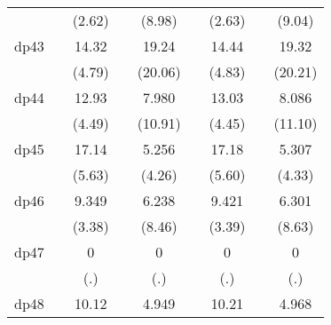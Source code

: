 {\begin{tabular}{l*{8}{c}}
            &                     &      (2.62)         &                     &      (8.98)         &                     &      (2.63)         &                     &      (9.04)         \\
[1em]
dp43        &                     &       14.32\sym{***}&                     &       19.24\sym{***}&                     &       14.44\sym{***}&                     &       19.32\sym{***}\\
            &                     &      (4.79)         &                     &     (20.06)         &                     &      (4.83)         &                     &     (20.21)         \\
[1em]
dp44        &                     &       12.93\sym{***}&                     &       7.980\sym{***}&                     &       13.03\sym{***}&                     &       8.086\sym{***}\\
            &                     &      (4.49)         &                     &     (10.91)         &                     &      (4.45)         &                     &     (11.10)         \\
[1em]
dp45        &                     &       17.14\sym{***}&                     &       5.256\sym{***}&                     &       17.18\sym{***}&                     &       5.307\sym{***}\\
            &                     &      (5.63)         &                     &      (4.26)         &                     &      (5.60)         &                     &      (4.33)         \\
[1em]
dp46        &                     &       9.349\sym{***}&                     &       6.238\sym{***}&                     &       9.421\sym{***}&                     &       6.301\sym{***}\\
            &                     &      (3.38)         &                     &      (8.46)         &                     &      (3.39)         &                     &      (8.63)         \\
[1em]
dp47        &                     &           0         &                     &           0         &                     &           0         &                     &           0         \\
            &                     &         (.)         &                     &         (.)         &                     &         (.)         &                     &         (.)         \\
[1em]
dp48        &                     &       10.12\sym{***}&                     &       4.949\sym{***}&                     &       10.21\sym{***}&                     &       4.968\sym{***}\\

\end{tabular}}
